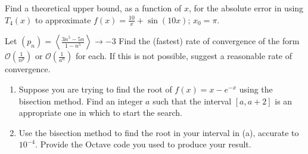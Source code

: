 \documentclass{article}
\theoremstyle{plain} %
\numberwithin{thm}{section} %
\theoremstyle{definition}
\begin{document}
    \newpage
    \begin{question}{4}
        Find a theoretical upper bound, as a function of \(x\), for the absolute error in using \(T_4(x)\) to approximate \(f(x) = \frac{10}{x} + \sin(10x)\); \(x_0 = \pi\).
    \end{question}
    \newpage
    \begin{question}{5}
        Let \((p_n) = \left\langle \frac{3n^5 - 5n}{1 - n^5} \right\rangle \to -3\) Find the (fastest) rate of convergence of the form \(\mathcal{O}\left(\frac{1}{n^p}\right)\) or \(\mathcal{O}\left(\frac{1}{a^n}\right)\) for each. If this is not possible, suggest a reasonable rate of convergence.
    \end{question}
    \newpage
    \begin{question}{6}
        \begin{enumerate}[label=(\alph*)]
            \item Suppose you are trying to find the root of \(f(x) = x - e^{-x}\) using the bisection method. Find an integer \(a\) such that the interval \([a, a+2]\) is an appropriate one in which to start the search.
            \item Use the bisection method to find the root in your interval in (a), accurate to \(10^{-4}\). Provide the Octave code you used to produce your result.
        \end{enumerate}
    \end{question}
\end{document}
